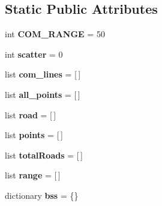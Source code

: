 \subsection*{Static Public Attributes}
\begin{DoxyCompactItemize}
\item 
\hypertarget{classmininet_1_1vanet_1_1vanet_a2dea2c7ab214863dfe21334f1c7ec9d9}{int {\bfseries C\-O\-M\-\_\-\-R\-A\-N\-G\-E} = 50}\label{classmininet_1_1vanet_1_1vanet_a2dea2c7ab214863dfe21334f1c7ec9d9}

\item 
\hypertarget{classmininet_1_1vanet_1_1vanet_ad148ef1b96a34475f565f4e551c2f45c}{int {\bfseries scatter} = 0}\label{classmininet_1_1vanet_1_1vanet_ad148ef1b96a34475f565f4e551c2f45c}

\item 
\hypertarget{classmininet_1_1vanet_1_1vanet_a4998a59eb16912b7c0b892ffefd7a94e}{list {\bfseries com\-\_\-lines} = \mbox{[}$\,$\mbox{]}}\label{classmininet_1_1vanet_1_1vanet_a4998a59eb16912b7c0b892ffefd7a94e}

\item 
\hypertarget{classmininet_1_1vanet_1_1vanet_a6ae048d68c85520fddcb80f347e59eaa}{list {\bfseries all\-\_\-points} = \mbox{[}$\,$\mbox{]}}\label{classmininet_1_1vanet_1_1vanet_a6ae048d68c85520fddcb80f347e59eaa}

\item 
\hypertarget{classmininet_1_1vanet_1_1vanet_a22d1d2e5834877099e836335dae26829}{list {\bfseries road} = \mbox{[}$\,$\mbox{]}}\label{classmininet_1_1vanet_1_1vanet_a22d1d2e5834877099e836335dae26829}

\item 
\hypertarget{classmininet_1_1vanet_1_1vanet_aeabfd747a36ea4705e55189d7512f04c}{list {\bfseries points} = \mbox{[}$\,$\mbox{]}}\label{classmininet_1_1vanet_1_1vanet_aeabfd747a36ea4705e55189d7512f04c}

\item 
\hypertarget{classmininet_1_1vanet_1_1vanet_ad89e8a34f0dc3b53264daaf97dd40352}{list {\bfseries total\-Roads} = \mbox{[}$\,$\mbox{]}}\label{classmininet_1_1vanet_1_1vanet_ad89e8a34f0dc3b53264daaf97dd40352}

\item 
\hypertarget{classmininet_1_1vanet_1_1vanet_a6af646bfb5ea64a96e87d823f2f8adad}{list {\bfseries range} = \mbox{[}$\,$\mbox{]}}\label{classmininet_1_1vanet_1_1vanet_a6af646bfb5ea64a96e87d823f2f8adad}

\item 
\hypertarget{classmininet_1_1vanet_1_1vanet_a269a5ef1148fbfa3050fd875fba533de}{dictionary {\bfseries bss} = \{\}}\label{classmininet_1_1vanet_1_1vanet_a269a5ef1148fbfa3050fd875fba533de}


\end{DoxyCompactItemize}
